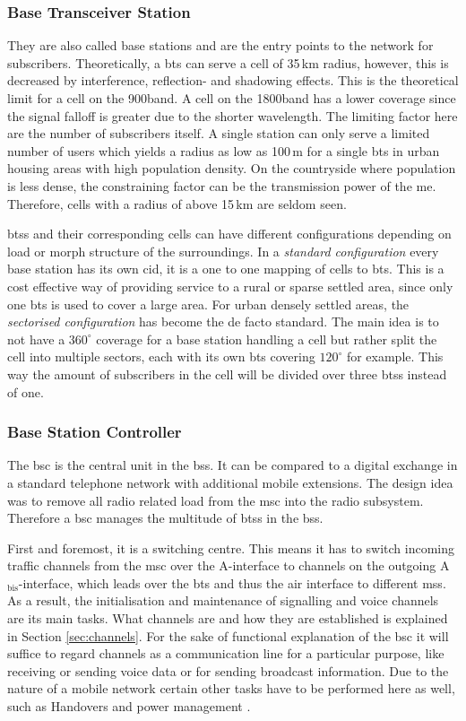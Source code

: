 \subsubsection{Base Transceiver Station}
They are also called base stations and are the entry points to the network for subscribers.
Theoretically, a \gls{bts} can serve a cell of 35\,km radius, however, this is decreased by interference, reflection- and shadowing effects.
This is the theoretical limit for a cell on the 900\MHz band.
A cell on the 1800\MHz band has a lower coverage since the signal falloff is greater due to the shorter wavelength.
The limiting factor here are the number of subscribers itself.
A single station can only serve a limited number of users which yields a radius as low as 100\,m for a single \gls{bts} in urban housing areas \cite{kommsys2006} with high population density.
On the countryside where population is less dense, the constraining factor can be the transmission power of the \gls{me}.
Therefore, cells with a radius of above 15\,km are seldom seen.

\glspl{bts} and their corresponding cells can have different configurations depending on load or morph structure of the surroundings.
In a \emph{standard configuration} every base station has its own \gls{cid}, it is a one to one mapping of cells to \gls{bts}.
This is a cost effective way of providing service to a rural or sparse settled area, since only one \gls{bts} is used to cover a large area.
For urban densely settled areas, the  \emph{sectorised configuration} has become the de facto standard.
The main idea is to not have a $360^\circ$ coverage for a base station handling a cell but rather split the cell into multiple sectors, each with its own \gls{bts} covering $120^\circ$ for example. 
This way the amount of subscribers in the cell will be divided over three \glspl{bts} instead of one.

\subsubsection{Base Station Controller}
The \gls{bsc} is the central unit in the \gls{bss}.
It can be compared to a digital exchange in a standard telephone network with additional mobile extensions.
The design idea was to remove all radio related load from the \gls{msc} into the radio subsystem.
Therefore a \gls{bsc} manages the multitude of \glspl{bts} in the \gls{bss}.

First and foremost, it is a switching centre.
This means it has to switch incoming traffic channels from the \gls{msc} over the A-interface to channels on the outgoing A$_\text{bis}$-interface, which leads over the \gls{bts} and thus the air interface to different \glspl{ms}.
As a result, the initialisation and maintenance of signalling and voice channels are its main tasks.
What channels are and how they are established is explained in Section \ref{sec:channels}.
For the sake of functional explanation of the \gls{bsc} it will suffice to regard channels as a communication line for a particular purpose, like receiving or sending voice data or  for sending broadcast information.
Due to the nature of a mobile network certain other tasks have to be performed here as well, such as Handovers and power management \cite{kommsys2006}.

